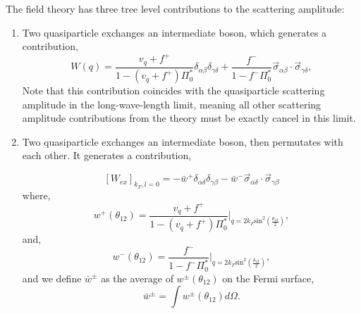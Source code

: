 \documentclass[reprint,amsmath,amssymb,aps,prb]{revtex4-1}
\begin{document}
The field theory has three tree level contributions to the scattering amplitude:
\begin{enumerate}
    \item Two quasiparticle exchanges an intermediate boson, which generates a contribution,
          \begin{equation}
              W(q) = \frac{v_q+f^+}{1-(v_q+f^+) \Pi_0^*}\delta_{\alpha\beta}\delta_{\gamma\delta}+\frac{f^-}{1-f^- \Pi_0^*}\vec{\sigma}_{\alpha\beta}\cdot \vec{\sigma}_{\gamma\delta},
          \end{equation}
          Note that this contribution coincides with the quasiparticle scattering amplitude in the long-wave-length limit, meaning all other scattering amplitude contributions from the theory must be exactly cancel in this limit.

    \item Two quasiparticle exchanges an intermediate boson, then permutates with each other. It generates a contribution,

          \begin{equation}
              \left[W_{ex}\right]_{k_F, l=0}=-\bar{w}^+\delta_{\alpha\delta}\delta_{\gamma\beta}-\bar{w}^-\vec{\sigma}_{\alpha\delta}\cdot \vec{\sigma}_{\gamma\beta}
          \end{equation}
          where,
          \begin{equation}
              w^+(\theta_{12})=\frac{v_q+f^+}{1-(v_q+f^+) \Pi_0^*}|_{q=2k_F\text{sin}^2(\frac{\theta_{12}}{2})},
          \end{equation}
          and,
          \begin{equation}
              w^-(\theta_{12})=\frac{f^-}{1-f^- \Pi_0^*}|_{q=2k_F\text{sin}^2(\frac{\theta_{12}}{2})},
          \end{equation}
          and we define $\bar{w}^{\pm}$ as the average of $w^{\pm}(\theta_{12})$ on the Fermi surface,
          \begin{equation}
              \bar{w}^{\pm}=\int w^{\pm}(\theta_{12})d\Omega .
          \end{equation}


\end{enumerate}
\end{document}
